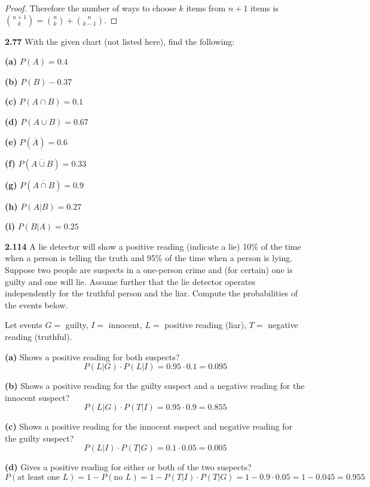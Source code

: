 \documentclass{exam}
\begin{document}
\begin{questions}
\begin{proof}
Therefore the number of ways to choose $k$ items from $n + 1$ items is $\binom{n + 1}{k} = \binom{n}{k} + \binom{n}{k - 1}$.
\end{proof}



\newpage
\textbf{2.77 }
With the given chart (not listed here), find the following:

\newline
\textbf{(a) } $P(A) = 0.4$

\textbf{(b) } $P(B) - 0.37$

\textbf{(c) } $P(A \cap B) = 0.1$

\textbf{(d) } $P(A \cup B) = 0.67$

\textbf{(e) } $P(\overline{A}) = 0.6$

\textbf{(f) } $P(\overline{A \cup B}) = 0.33$

\textbf{(g) } $P(\overline{A \cap B}) = 0.9$

\textbf{(h) } $P(A | B) = 0.27$

\textbf{(i) } $P(B | A) = 0.25$

\newpage
\textbf{2.114 }
A lie detector will show a positive reading (indicate a lie) 10\% of the time when a person is telling the truth and 95\% of the time when a person is lying. Suppose two people are suspects in a one-person crime and (for certain) one is guilty and one will lie. Assume further that the lie detector operates independently for the truthful person and the liar. Compute the probabilities of the events below.

\newline
Let events $G = $ guilty, $I = $ innocent, $L = $ positive reading (liar), $T = $ negative reading (truthful).
\newline

\textbf{(a) } Shows a positive reading for both suspects?
\sol
$$P(L | G) \cdot P(L | I) = 0.95 \cdot 0.1 = 0.095$$

\textbf{(b) } Shows a positive reading for the guilty suspect and a negative reading for the innocent suspect?
\sol
$$P(L | G) \cdot P(T | I) = 0.95 \cdot 0.9 = 0.855$$

\textbf{(c) } Shows a positive reading for the innocent suspect and negative reading for the guilty suspect?
\sol
$$P(L | I) \cdot P(T | G) = 0.1 \cdot 0.05 = 0.005$$

\textbf{(d) } Gives a positive reading for either or both of the two suspects?
\sol
$$P(\text{at least one } L) = 1 - P(\text{no } L) = 1 - P(T | I) \cdot P(T | G) = 1 - 0.9 \cdot 0.05 = 1 - 0.045 = 0.955$$


\end{questions}
\end{document}
